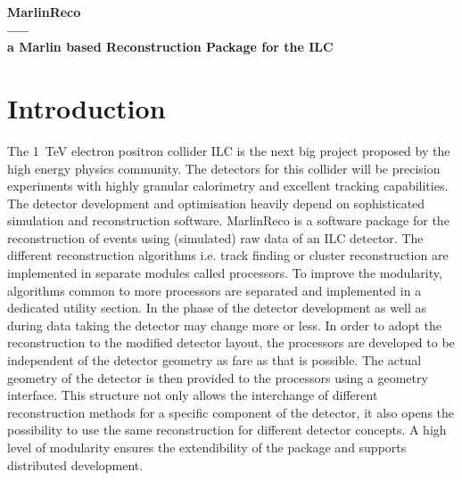 \begin{center}
{\large \bf
MarlinReco \\ ----- \\ 
a Marlin based Reconstruction Package for the ILC}
\end{center}

\begin{abstract}
This document is meant to serve as a comprehensive manual to help 
users getting started with the Marlin based reconstruction software MarlinReco
for the international linear collider (ILC). 
After a short review of the underlying packages 
(LCIO, Gear, Marlin, MarlinReco) and a summary of required libraries,
a introduction to the features of MarlinReco is given. 
Furthermore a detailed description helps to install MarlinReco  
together with all underlying packages. It is also explained how
to invoke MarlinReco and influence its behaviour using the steering file.
Finally you learn how to write own processors so that many 
scientist from the HEP community can contribute to this Project.  
\end{abstract}

\section{Introduction}

The 1~TeV electron positron collider ILC is the next big project proposed by
the high energy physics community. The detectors for this collider will be
precision experiments with highly granular calorimetry and excellent tracking
capabilities. The detector development and optimisation heavily depend on 
sophisticated simulation and reconstruction software.
MarlinReco is a software package for the reconstruction of events using 
(simulated) raw data of an ILC detector. The different reconstruction 
algorithms i.e. 
track finding or cluster reconstruction are implemented in separate modules 
called processors. To improve the modularity, algorithms 
common to more processors are separated and implemented in a dedicated 
utility section. In the phase of the detector development as well as
during data taking the detector may change more or less. In order to adopt 
the reconstruction to the modified detector layout, the processors are 
developed to be independent of the detector geometry as fare as that is 
possible. The actual geometry of the detector is then provided to the 
processors using a geometry interface. 
This structure not only allows the interchange of different
reconstruction methods for a specific component of the detector, it also opens
the possibility to use the same reconstruction for different 
detector concepts. A high level of modularity ensures the
extendibility of the package and supports distributed development.


